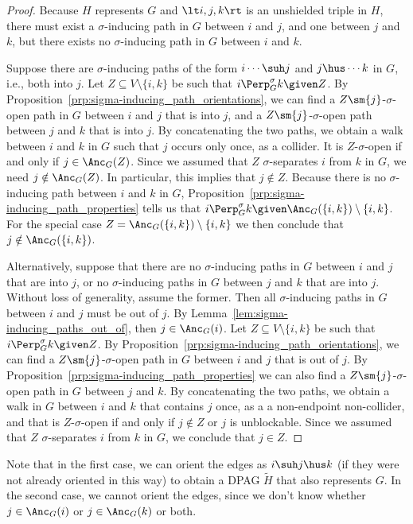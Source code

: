 \begin{proof}
  Because $H$ represents $G$ and $\lt i,j,k \rt$ is an unshielded triple in $H$, there must exist a $\sigma$-inducing path in $G$ between $i$ and $j$, and one between $j$ and $k$, but there exists no $\sigma$-inducing path in $G$ between $i$ and $k$.

  Suppose there are $\sigma$-inducing paths of the form $i \cdots \suh j$ and $j \hus \cdots k$ in $G$, i.e., both into $j$. 
  Let $Z \subseteq V \setminus \{i,k\}$ be such that $i \Perp^\sigma_G k \given Z$.
  By Proposition~\ref{prp:sigma-inducing_path_orientations}, we can find a $Z \sm \{j\}$-$\sigma$-open path in $G$ between $i$ and $j$ that is into $j$, and a $Z \sm \{j\}$-$\sigma$-open path between $j$ and $k$ that is into $j$.
  By concatenating the two paths, we obtain a walk between $i$ and $k$ in $G$ such that $j$ occurs only once, as a collider. 
  It is $Z$-$\sigma$-open if and only if $j \in \Anc_G(Z)$.
  Since we assumed that $Z$ $\sigma$-separates $i$ from $k$ in $G$, we need $j \notin \Anc_G(Z)$.
  In particular, this implies that $j \notin Z$.
  Because there is no $\sigma$-inducing path between $i$ and $k$ in $G$, Proposition~\ref{prp:sigma-inducing_path_properties} tells us that $i \Perp^\sigma_G k \given \Anc_G(\{i,k\}) \setminus \{i,k\}$.
  For the special case $Z = \Anc_G(\{i,k\}) \setminus \{i,k\}$ we then conclude that $j \notin \Anc_G(\{i,k\})$.

  Alternatively, suppose that there are no $\sigma$-inducing paths in $G$ between $i$ and $j$ that are into $j$, or no $\sigma$-inducing paths in $G$ between $j$ and $k$ that are into $j$.
  Without loss of generality, assume the former.
  Then all $\sigma$-inducing paths in $G$ between $i$ and $j$ must be out of $j$.
  By Lemma~\ref{lem:sigma-inducing_paths_out_of}, then $j \in \Anc_G(i)$.
  Let $Z \subseteq V \setminus \{i,k\}$ be such that $i \Perp^\sigma_G k \given Z$.
  By Proposition~\ref{prp:sigma-inducing_path_orientations}, we can find a $Z \sm \{j\}$-$\sigma$-open path in $G$ between $i$ and $j$ that is out of $j$.
  By Proposition~\ref{prp:sigma-inducing_path_properties} we can also find a $Z \sm \{j\}$-$\sigma$-open path in $G$ between $j$ and $k$.
  By concatenating the two paths, we obtain a walk in $G$ between $i$ and $k$ that contains $j$ once, as a a non-endpoint non-collider, and that is $Z$-$\sigma$-open if and only if $j \notin Z$ or $j$ is unblockable.
  Since we assumed that $Z$ $\sigma$-separates $i$ from $k$ in $G$,
  we conclude that $j \in Z$.
\end{proof}
Note that in the first case, we can orient the edges as $i \suh j \hus k$ (if they were not already oriented in this way) to obtain a DPAG $\tilde{H}$ that also represents $G$. 
In the second case, we cannot orient the edges, since we don't know whether $j \in \Anc_G(i)$ or $j \in \Anc_G(k)$ or both.

